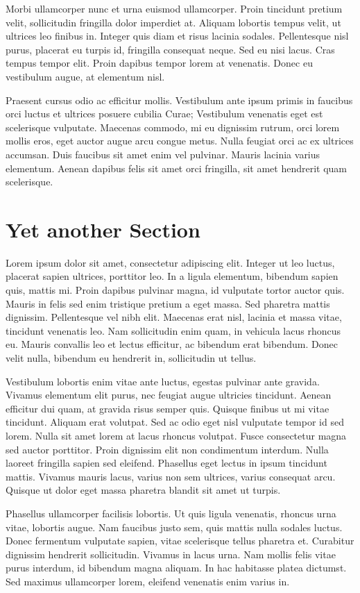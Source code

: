 Morbi ullamcorper nunc et urna euismod ullamcorper. Proin tincidunt pretium velit, sollicitudin fringilla dolor imperdiet at. Aliquam lobortis tempus velit, ut ultrices leo finibus in. Integer quis diam et risus lacinia sodales. Pellentesque nisl purus, placerat eu turpis id, fringilla consequat neque. Sed eu nisi lacus. Cras tempus tempor elit. Proin dapibus tempor lorem at venenatis. Donec eu vestibulum augue, at elementum nisl.

Praesent cursus odio ac efficitur mollis. Vestibulum ante ipsum primis in faucibus orci luctus et ultrices posuere cubilia Curae; Vestibulum venenatis eget est scelerisque vulputate. Maecenas commodo, mi eu dignissim rutrum, orci lorem mollis eros, eget auctor augue arcu congue metus. Nulla feugiat orci ac ex ultrices accumsan. Duis faucibus sit amet enim vel pulvinar. Mauris lacinia varius elementum. Aenean dapibus felis sit amet orci fringilla, sit amet hendrerit quam scelerisque.

\section{Yet another Section}
Lorem ipsum dolor sit amet, consectetur adipiscing elit. Integer ut leo luctus, placerat sapien ultrices, porttitor leo. In a ligula elementum, bibendum sapien quis, mattis mi. Proin dapibus pulvinar magna, id vulputate tortor auctor quis. Mauris in felis sed enim tristique pretium a eget massa. Sed pharetra mattis dignissim. Pellentesque vel nibh elit. Maecenas erat nisl, lacinia et massa vitae, tincidunt venenatis leo. Nam sollicitudin enim quam, in vehicula lacus rhoncus eu. Mauris convallis leo et lectus efficitur, ac bibendum erat bibendum. Donec velit nulla, bibendum eu hendrerit in, sollicitudin ut tellus.

Vestibulum lobortis enim vitae ante luctus, egestas pulvinar ante gravida. Vivamus elementum elit purus, nec feugiat augue ultricies tincidunt. Aenean efficitur dui quam, at gravida risus semper quis. Quisque finibus ut mi vitae tincidunt. Aliquam erat volutpat. Sed ac odio eget nisl vulputate tempor id sed lorem. Nulla sit amet lorem at lacus rhoncus volutpat. Fusce consectetur magna sed auctor porttitor. Proin dignissim elit non condimentum interdum. Nulla laoreet fringilla sapien sed eleifend. Phasellus eget lectus in ipsum tincidunt mattis. Vivamus mauris lacus, varius non sem ultrices, varius consequat arcu. Quisque ut dolor eget massa pharetra blandit sit amet ut turpis.

Phasellus ullamcorper facilisis lobortis. Ut quis ligula venenatis, rhoncus urna vitae, lobortis augue. Nam faucibus justo sem, quis mattis nulla sodales luctus. Donec fermentum vulputate sapien, vitae scelerisque tellus pharetra et. Curabitur dignissim hendrerit sollicitudin. Vivamus in lacus urna. Nam mollis felis vitae purus interdum, id bibendum magna aliquam. In hac habitasse platea dictumst. Sed maximus ullamcorper lorem, eleifend venenatis enim varius in.

